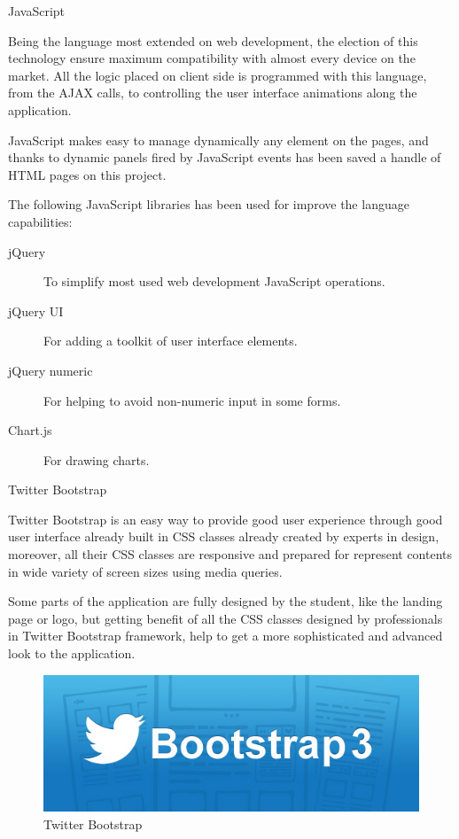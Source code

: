 \documentclass{DeustoFDP}
\begin{document}
{\large JavaScript}

Being the language most extended on web development, the election of this technology ensure maximum compatibility with almost every device on the market. All the logic placed on client side is programmed with this language, from the AJAX calls, to controlling the user interface animations along the application.

JavaScript makes easy to manage dynamically any element on the pages, and thanks to dynamic panels fired by JavaScript events has been saved a handle of HTML pages on this project.

The following JavaScript libraries has been used for improve the language capabilities:
\begin{description}
	\item[jQuery] To simplify most used web development JavaScript operations.
	\item[jQuery UI] For adding a toolkit of user interface elements.
	\item[jQuery numeric] For helping to avoid non-numeric input in some forms.
	\item[Chart.js] For drawing charts.
\end{description}

{\large Twitter Bootstrap}

Twitter Bootstrap \cite{Twitterbootstrap} is an easy way to provide good user experience through good user interface already built in CSS classes already created by experts in design, moreover, all their CSS classes are responsive and prepared for represent contents in wide variety of screen sizes using media queries.

Some parts of the application are fully designed by the student, like the landing page or logo, but getting benefit of all the CSS classes designed by professionals in Twitter Bootstrap framework, help to get a more sophisticated and advanced look to the application.

\begin{figure}[h]
\centering
\includegraphics[width=0.7\linewidth]{fig/bootstrap-3}
\caption[Twitter Bootstrap]{Twitter Bootstrap}
\label{fig:bootstrap-3}
\end{figure}
\end{document}
